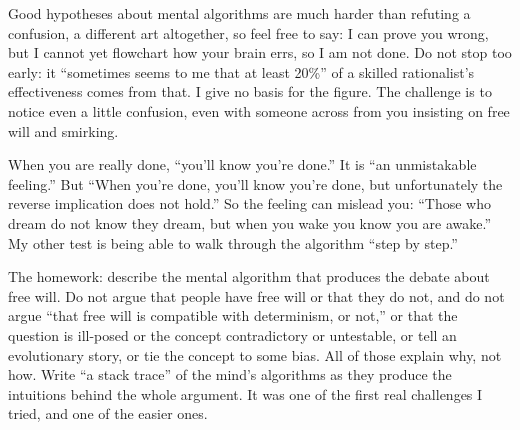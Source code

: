 Good hypotheses about mental algorithms are much harder than refuting a confusion, a different art altogether, so feel free to say: I can prove you wrong, but I cannot yet flowchart how your brain errs, so I am not done. Do not stop too early: it ``sometimes seems to me that at least 20\%'' of a skilled rationalist's effectiveness comes from that. I give no basis for the figure. The challenge is to notice even a little confusion, even with someone across from you insisting on free will and smirking.

When you are really done, ``you'll know you're done.'' It is ``an unmistakable feeling.'' But ``When you're done, you'll know you're done, but unfortunately the reverse implication does not hold.'' So the feeling can mislead you: ``Those who dream do not know they dream, but when you wake you know you are awake.'' My other test is being able to walk through the algorithm ``step by step.''

The homework: describe the mental algorithm that produces the debate about free will. Do not argue that people have free will or that they do not, and do not argue ``that free will is compatible with determinism, or not,'' or that the question is ill-posed or the concept contradictory or untestable, or tell an evolutionary story, or tie the concept to some bias. All of those explain why, not how. Write ``a stack trace'' of the mind's algorithms as they produce the intuitions behind the whole argument. It was one of the first real challenges I tried, and one of the easier ones. 
